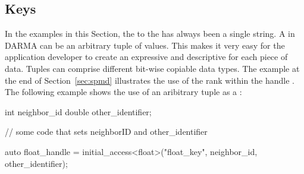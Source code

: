 
\subsection{Keys}
\label{subsec:keys}
In the examples in this Section, the  to the
 has always been a single string. 
A  in DARMA 
can be an arbitrary \gls{tuple} of values.  This 
makes it very easy for the application developer to create an expressive
and descriptive  for each piece of data.  Tuples can comprise
different bit-wise copiable data types.  The example at the end of
Section~\ref{sec:spmd} illustrates the use of the \gls{rank} within the handle
.  The following example shows the use of an
aribitrary \gls{tuple} as a :
\begin{CppCode}
  int neighbor_id
  double other_identifier;

  // some code that sets neighborID and other_identifier
  
  auto float_handle = initial_access<float>("float_key", 
                                            neighbor_id, 
                                            other_identifier);
\end{CppCode}


